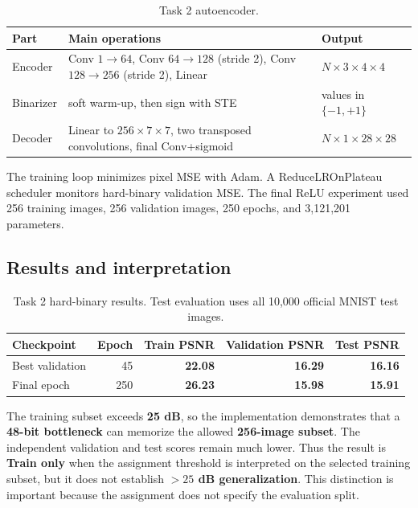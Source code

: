 \documentclass[11pt]{article}
\newcommand{\partialpass}{\textcolor{orange!80!black}{\textbf{Train only}}}
\newcommand{\keydata}[1]{\textbf{#1}}
\newcommand{\keyarch}[1]{\textcolor{codeblue}{\textbf{#1}}}
\begin{document}
\begin{table}[H]
\centering
\caption{Task 2 autoencoder.}
\begin{tabularx}{\textwidth}{lXl}
\toprule
Part & Main operations & Output \\
\midrule
Encoder & Conv $1\rightarrow64$, Conv $64\rightarrow128$ (stride 2), Conv $128\rightarrow256$ (stride 2), Linear & $N\times3\times4\times4$ \\
Binarizer & soft warm-up, then sign with STE & values in $\{-1,+1\}$ \\
Decoder & Linear to $256\times7\times7$, two transposed convolutions, final Conv+sigmoid & $N\times1\times28\times28$ \\
\bottomrule
\end{tabularx}
\end{table}

The training loop minimizes pixel MSE with Adam. A ReduceLROnPlateau scheduler monitors hard-binary validation MSE. The final ReLU experiment used 256 training images, 256 validation images, 250 epochs, and 3,121,201 parameters.

\subsection{Results and interpretation}

\begin{table}[H]
\centering
\caption{Task 2 hard-binary results. Test evaluation uses all 10,000 official MNIST test images.}
\begin{tabular}{lrrrr}
\toprule
Checkpoint & Epoch & Train PSNR & Validation PSNR & Test PSNR \\
\midrule
Best validation & 45 & \keydata{22.08} & \keydata{16.29} & \keydata{16.16} \\
Final epoch & 250 & \keydata{26.23} & \keydata{15.98} & \keydata{15.91} \\
\bottomrule
\end{tabular}
\end{table}

The training subset exceeds \keydata{25 dB}, so the implementation demonstrates that a \keyarch{48-bit bottleneck} can memorize the allowed \keydata{256-image subset}. The independent validation and test scores remain much lower. Thus the result is \partialpass{} when the assignment threshold is interpreted on the selected training subset, but it does not establish \keydata{$>25$ dB generalization}. This distinction is important because the assignment does not specify the evaluation split.
\end{document}
